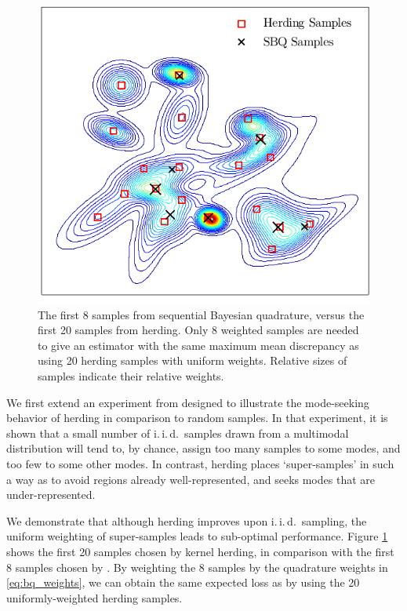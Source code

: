 \begin{figure}
\centering
\includegraphics[width=\columnwidth]{figs/herding/fig1_v2}
\caption[Sequential Bayesian quadrature versus kernel herding]{The first 8 samples from sequential Bayesian quadrature, versus the first 20 samples from herding. Only 8 weighted \sbq{} samples are needed to give an estimator with the same maximum mean discrepancy as using 20 herding samples with uniform weights. Relative sizes of samples indicate their relative weights.}
\label{fig:fig1}
\end{figure} 

We first extend an experiment from \citep{chen2010super} designed to illustrate the mode-seeking behavior of herding in comparison to random samples. In that experiment, %
it is shown that a small number of i.\,i.\,d.\ samples drawn from a multimodal distribution will tend to, by chance, assign too many samples to some modes, and too few to some other modes. In contrast, herding places `super-samples' in such a way as to avoid regions already well-represented, and seeks modes that are under-represented.

We demonstrate that although herding improves upon i.\,i.\,d.\ sampling, the uniform weighting of super-samples leads to sub-optimal performance. Figure \ref{fig:fig1} shows the first 20 samples chosen by kernel herding, in comparison with the first 8 samples chosen by \sbq{}. By weighting the 8 \sbq{} samples by the quadrature weights in \eqref{eq:bq_weights}, we can obtain the same expected loss as by using the 20 uniformly-weighted herding samples. 

